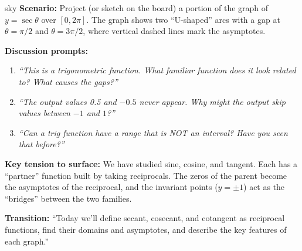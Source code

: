 \documentclass[10pt]{article}
\begin{document}
\begin{skillbox}{sky}
\textbf{Scenario:} Project (or sketch on the board) a portion of the graph
of $y = \sec\theta$ over $[0, 2\pi]$. The graph shows two ``U-shaped'' arcs
with a gap at $\theta = \pi/2$ and $\theta = 3\pi/2$, where vertical
dashed lines mark the asymptotes.

\textbf{Discussion prompts:}
\begin{enumerate}[leftmargin=1.4em, itemsep=3pt]
  \item \textit{``This is a trigonometric function. What familiar function does
    it look related to? What causes the gaps?''}
  \item \textit{``The output values 0.5 and $-0.5$ never appear. Why might
    the output skip values between $-1$ and $1$?''}
  \item \textit{``Can a trig function have a range that is NOT an interval?
    Have you seen that before?''}
\end{enumerate}

\textbf{Key tension to surface:} We have studied sine, cosine, and tangent.
Each has a ``partner'' function built by taking reciprocals. The zeros of
the parent become the asymptotes of the reciprocal, and the invariant points
($y = \pm 1$) act as the ``bridges'' between the two families.

\textbf{Transition:} ``Today we'll define secant, cosecant, and cotangent
as reciprocal functions, find their domains and asymptotes, and describe
the key features of each graph.''
\end{skillbox}

\vspace{0.08in}
\end{document}
